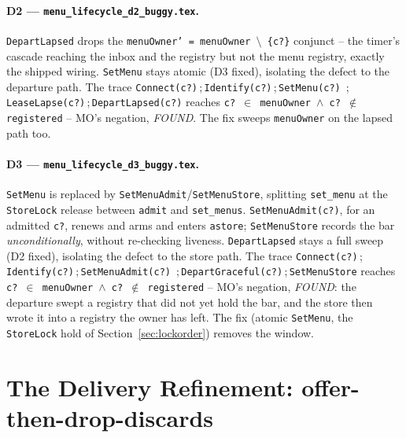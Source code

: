 \documentclass[a4paper,10pt,fleqn]{article}
\begin{document}
\paragraph{D2 --- \texttt{menu\_lifecycle\_d2\_buggy.tex}.}
\label{sec:fidelity-d2}
\texttt{DepartLapsed} drops the \texttt{menuOwner' = menuOwner $\setminus$
\{c?\}} conjunct -- the timer's cascade reaching the inbox and the registry
but not the menu registry, exactly the shipped wiring. \texttt{SetMenu}
stays atomic (D3 fixed), isolating the defect to the departure path. The
trace \texttt{Connect(c?)}\,;\,\texttt{Identify(c?)}\,;\,\texttt{SetMenu(c?)}
\,;\,\texttt{LeaseLapse(c?)}\,;\,\texttt{DepartLapsed(c?)} reaches
\texttt{c? $\in$ menuOwner $\land$ c? $\notin$ registered} -- MO's negation,
\emph{FOUND}. The fix sweeps \texttt{menuOwner} on the lapsed path too.

\paragraph{D3 --- \texttt{menu\_lifecycle\_d3\_buggy.tex}.}
\label{sec:fidelity-d3}
\texttt{SetMenu} is replaced by \texttt{SetMenuAdmit}/\texttt{SetMenuStore},
splitting \texttt{set\_menu} at the \texttt{StoreLock} release between
\texttt{admit} and \texttt{set\_menus}. \texttt{SetMenuAdmit(c?)}, for an
admitted \texttt{c?}, renews and arms and enters \texttt{astore};
\texttt{SetMenuStore} records the bar \emph{unconditionally}, without
re-checking liveness. \texttt{DepartLapsed} stays a full sweep (D2 fixed),
isolating the defect to the store path. The trace
\texttt{Connect(c?)}\,;\,\texttt{Identify(c?)}\,;\,\texttt{SetMenuAdmit(c?)}
\,;\,\texttt{DepartGraceful(c?)}\,;\,\texttt{SetMenuStore} reaches
\texttt{c? $\in$ menuOwner $\land$ c? $\notin$ registered} -- MO's negation,
\emph{FOUND}: the departure swept a registry that did not yet hold the bar,
and the store then wrote it into a registry the owner has left. The fix
(atomic \texttt{SetMenu}, the \texttt{StoreLock} hold of
Section~\ref{sec:lockorder}) removes the window.

\section{The Delivery Refinement: offer-then-drop-discards}
\label{sec:delivery-refinement}
\end{document}
